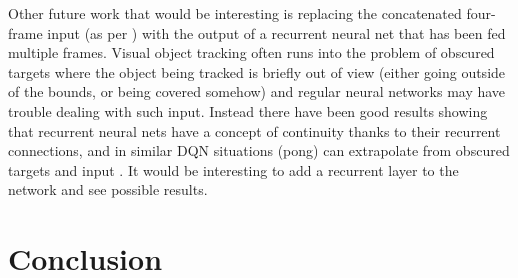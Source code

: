 \documentclass[letterpaper,12pt,titlepage,oneside,final]{book}
\let\origdoublepage\cleardoublepage
\newcommand{\clearemptydoublepage}{%
  \clearpage{\pagestyle{empty}\origdoublepage}}
\let\cleardoublepage\clearemptydoublepage
\begin{document}
Other future work that would be interesting is replacing the concatenated four-frame input (as per \cite{atari-dqn}) with the output of a recurrent neural net that has been fed multiple frames. Visual object tracking often runs into the problem of obscured targets where the object being tracked is briefly out of view (either going outside of the bounds, or being covered somehow) and regular neural networks may have trouble dealing with such input. Instead there have been good results showing that recurrent neural nets have a concept of continuity thanks to their recurrent connections, and in similar DQN situations (pong) can extrapolate from obscured targets and input \cite{drqn}. It would be interesting to add a recurrent layer to the network and see possible results.

\chapter{Conclusion}

\appendix



\cleardoublepage %
\renewcommand*{\bibname}{References}




\nocite{*}
\end{document}
